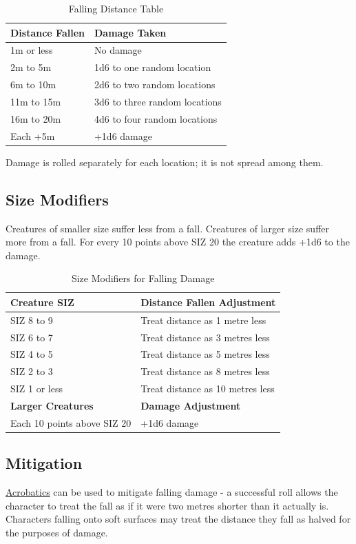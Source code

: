 \documentclass[10pt]{article}
\begin{document}
\begin{table}[h]
\centering
\caption{Falling Distance Table}
\label{tab:falling}
\begin{tabular}{ll}
\toprule
\textbf{Distance Fallen} & \textbf{Damage Taken} \\
\midrule
1m or less & No damage \\
2m to 5m & 1d6 to one random location \\
6m to 10m & 2d6 to two random locations \\
11m to 15m & 3d6 to three random locations \\
16m to 20m & 4d6 to four random locations \\
Each +5m & +1d6 damage \\
\bottomrule
\end{tabular}
\end{table}

Damage is rolled separately for each location; it is not spread among them.

\subsection{Size Modifiers}
\label{sec:falling-size}
Creatures of smaller size suffer less from a fall. Creatures of larger size suffer more from a fall. For every 10 points above SIZ 20 the creature adds +1d6 to the damage.

\begin{table}[h]
\centering
\caption{Size Modifiers for Falling Damage}
\label{tab:falling-size}
\begin{tabular}{ll}
\toprule
\textbf{Creature SIZ} & \textbf{Distance Fallen Adjustment} \\
\midrule
SIZ 8 to 9 & Treat distance as 1 metre less \\
SIZ 6 to 7 & Treat distance as 3 metres less \\
SIZ 4 to 5 & Treat distance as 5 metres less \\
SIZ 2 to 3 & Treat distance as 8 metres less \\
SIZ 1 or less & Treat distance as 10 metres less \\
\midrule
\textbf{Larger Creatures} & \textbf{Damage Adjustment} \\
\midrule
Each 10 points above SIZ 20 & +1d6 damage \\
\bottomrule
\end{tabular}
\end{table}

\subsection{Mitigation}
\hyperref[skill:acrobatics]{Acrobatics} can be used to mitigate falling damage - a successful roll allows the character to treat the fall as if it were two metres shorter than it actually is. Characters falling onto soft surfaces may treat the distance they fall as halved for the purposes of damage.
\end{document}
